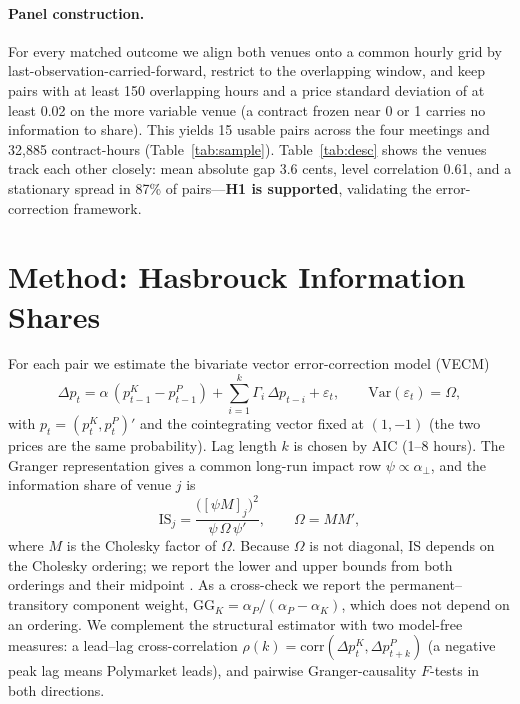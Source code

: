 \documentclass[12pt]{article}
\begin{document}
\paragraph{Panel construction.} For every matched outcome we align both venues onto a common
hourly grid by last-observation-carried-forward, restrict to the overlapping window, and
keep pairs with at least 150 overlapping hours and a price standard deviation of at least
0.02 on the more variable venue (a contract frozen near 0 or 1 carries no information to
share). This yields 15 usable pairs across the four meetings and 32{,}885 contract-hours
(Table~\ref{tab:sample}). Table~\ref{tab:desc} shows the venues track each other closely:
mean absolute gap 3.6 cents, level correlation 0.61, and a stationary spread in 87\% of
pairs---\textbf{H1 is supported}, validating the error-correction framework.

\section{Method: Hasbrouck Information Shares}\label{sec:method}
For each pair we estimate the bivariate vector error-correction model (VECM)
\begin{equation}
\Delta p_t = \alpha\,(p^K_{t-1}-p^P_{t-1}) + \sum_{i=1}^{k}\Gamma_i\,\Delta p_{t-i}
+ \varepsilon_t,\qquad \mathrm{Var}(\varepsilon_t)=\Omega,
\end{equation}
with $p_t=(p^K_t,p^P_t)'$ and the cointegrating vector fixed at $(1,-1)$ (the two prices are
the same probability). Lag length $k$ is chosen by AIC (1--8 hours). The Granger
representation gives a common long-run impact row $\psi\propto\alpha_\perp$, and the
\citet{hasbrouck1995} information share of venue $j$ is
\begin{equation}
\mathrm{IS}_j=\frac{\big([\psi M]_j\big)^2}{\psi\,\Omega\,\psi'},\qquad \Omega=MM',
\end{equation}
where $M$ is the Cholesky factor of $\Omega$. Because $\Omega$ is not diagonal, IS depends on
the Cholesky ordering; we report the lower and upper bounds from both orderings and their
midpoint \citep{baillie2002}. As a cross-check we report the \citet{gonzalo1995}
permanent--transitory component weight, $\mathrm{GG}_K=\alpha_P/(\alpha_P-\alpha_K)$, which
does not depend on an ordering. We complement the structural estimator with two
model-free measures: a lead--lag cross-correlation
$\rho(k)=\mathrm{corr}(\Delta p^K_t,\Delta p^P_{t+k})$ (a negative peak lag means Polymarket
leads), and pairwise Granger-causality $F$-tests in both directions.
\end{document}
